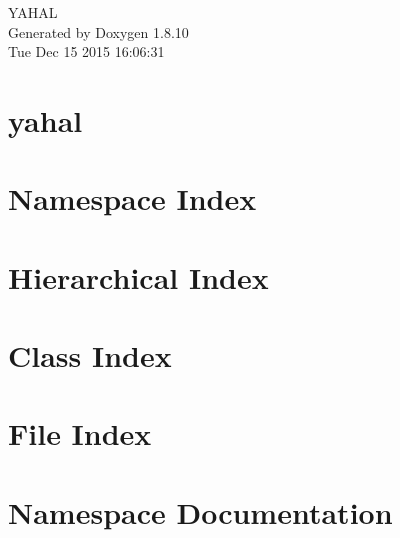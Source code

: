 \documentclass[twoside]{book}
\newcommand{\+}{\discretionary{\mbox{\scriptsize$\hookleftarrow$}}{}{}}
\newcommand{\clearemptydoublepage}{%
  \newpage{\pagestyle{empty}\cleardoublepage}%
}
\begin{document}
\hypersetup{pageanchor=false,
             bookmarks=true,
             bookmarksnumbered=true,
             pdfencoding=unicode
            }
\begin{titlepage}
\vspace*{7cm}
\begin{center}%
{\Large Y\+A\+H\+A\+L }\\
\vspace*{1cm}
{\large Generated by Doxygen 1.8.10}\\
\vspace*{0.5cm}
{\small Tue Dec 15 2015 16:06:31}\\
\end{center}
\end{titlepage}
\clearemptydoublepage
\tableofcontents
\clearemptydoublepage
{}
\hypersetup{pageanchor=true}

\chapter{yahal}
\label{md__home_andy__documentos__source_yahal__r_e_a_d_m_e}
\hypertarget{md__home_andy__documentos__source_yahal__r_e_a_d_m_e}{}

\chapter{Namespace Index}

\chapter{Hierarchical Index}

\chapter{Class Index}

\chapter{File Index}

\chapter{Namespace Documentation}


\end{document}
